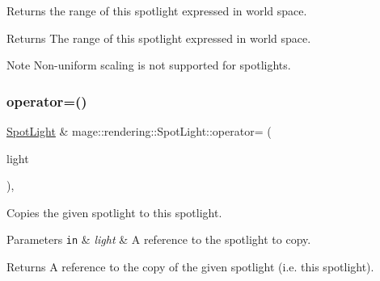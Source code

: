 Returns the range of this spotlight expressed in world space.

\begin{DoxyReturn}{Returns}
The range of this spotlight expressed in world space. 
\end{DoxyReturn}
\begin{DoxyNote}{Note}
Non-\/uniform scaling is not supported for spotlights. 
\end{DoxyNote}
\mbox{\label{classmage_1_1rendering_1_1_spot_light_a6bf91b086aa54f2e31d92ed401cf0fdc}} 
\subsubsection{\texorpdfstring{operator=()}{operator=()}\hspace{0.1cm}{\footnotesize\ttfamily [1/2]}}
{\footnotesize\ttfamily \mbox{\hyperlink{classmage_1_1rendering_1_1_spot_light}{Spot\+Light}} \& mage\+::rendering\+::\+Spot\+Light\+::operator= (\begin{DoxyParamCaption}\item[{const \mbox{\hyperlink{classmage_1_1rendering_1_1_spot_light}{Spot\+Light}} \&}]{light }\end{DoxyParamCaption})\hspace{0.3cm}{\ttfamily [default]}, {\ttfamily [noexcept]}}

Copies the given spotlight to this spotlight.


\begin{DoxyParams}[1]{Parameters}
\mbox{\tt in}  & {\em light} & A reference to the spotlight to copy. \\
\hline
\end{DoxyParams}
\begin{DoxyReturn}{Returns}
A reference to the copy of the given spotlight (i.\+e. this spotlight). 
\end{DoxyReturn}
\mbox{\label{classmage_1_1rendering_1_1_spot_light_a58ff20b0459ccd6df54c85a361faa5ad}} 
